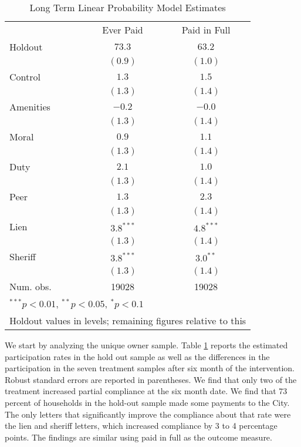 \documentclass[12pt]{article}
\begin{document}
\begin{table}[htbp]
\caption{Long Term Linear Probability Model Estimates}\label{lg_pc_lin}
\bigskip
\centering
\begin{tabular}{l c c }
\hline
          & Ever Paid & Paid in Full \\
Holdout   & $73.3$ & $63.2$ \\
\hline
          & $(0.9)$      & $(1.0)$      \\
Control   & $1.3$        & $1.5$        \\
          & $(1.3)$      & $(1.4)$      \\
Amenities & $-0.2$       & $-0.0$       \\
          & $(1.3)$      & $(1.4)$      \\
Moral     & $0.9$        & $1.1$        \\
          & $(1.3)$      & $(1.4)$      \\
Duty      & $2.1$        & $1.0$        \\
          & $(1.3)$      & $(1.4)$      \\
Peer      & $1.3$        & $2.3$        \\
          & $(1.3)$      & $(1.4)$      \\
Lien      & $3.8^{***}$  & $4.8^{***}$  \\
          & $(1.3)$      & $(1.4)$      \\
Sheriff   & $3.8^{***}$  & $3.0^{**}$   \\
          & $(1.3)$      & $(1.4)$      \\
\hline
Num. obs. & 19028        & 19028        \\
\hline
\multicolumn{3}{l}{\scriptsize{$^{***}p<0.01$, $^{**}p<0.05$, $^*p<0.1$}} \\
\multicolumn{3}{l}{\scriptsize{Holdout values in levels; remaining figures relative to this}}
\end{tabular}
 \end{table}


We start by analyzing the unique owner sample.  Table \ref{lg_pc_lin}
reports the estimated participation rates in the hold out sample as
well as the differences in the participation in the seven treatment
samples after six month of the intervention. Robust standard errors
are reported in parentheses. We find that only two of the treatment
increased partial compliance at the six month date.  We find that 73
percent of households in the hold-out sample made some payments to the
City. The only letters that significantly improve the compliance about
that rate were the lien and sheriff letters, which increased
compliance by 3 to 4 percentage points. The findings are similar using
paid in full as the outcome measure.
\end{document}
